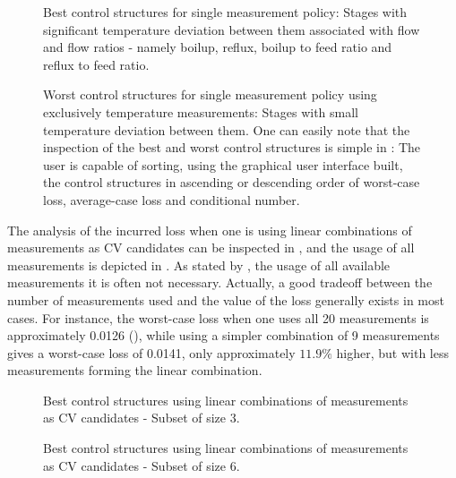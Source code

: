 \documentclass[../../msc-thesis.tex]{subfiles}
\begin{document}
\begin{figure}[htb]
    \centering
    \caption{Best control structures for single measurement policy: Stages 
    with significant temperature deviation between them associated with 
    flow and flow ratios - namely boilup, reflux, boilup to feed ratio and 
    reflux to feed ratio.}
    \label{fig:c3cvgood}
\end{figure}

\begin{figure}[htb]
    \centering
    \caption{Worst control structures for single measurement policy using 
    exclusively temperature measurements: Stages with small temperature 
    deviation between them. One can easily note that the inspection of the 
    best and worst control structures is simple in \mtc: The user is capable 
    of sorting, using the graphical user interface built, the control 
    structures in ascending or descending order of worst-case loss, 
    average-case loss and conditional number.}
    \label{fig:c3cvtempbad}
\end{figure}


The analysis of the incurred loss when one is using linear combinations of 
measurements as CV candidates can be inspected in 
, and the usage of all measurements is depicted in 
. As stated by \textcite{Kariwala2008}, the usage of all 
available measurements it is often not necessary. Actually, a good tradeoff 
between the number of measurements used and the value of the loss generally 
exists in most cases. For instance, the worst-case loss when one uses all 
20 measurements is  approximately 0.0126 (), while using a 
simpler combination of 9 measurements gives a worst-case loss of 0.0141, 
only  approximately $11.9 \%$ higher, but with less measurements forming the 
linear combination.

\begin{figure}[htb]
    \centering
    \caption{Best control structures using linear combinations of measurements 
    as CV candidates - Subset of size 3.}
    \label{fig:c3ss3}
\end{figure}

\begin{figure}[htb]
    \centering
    \caption{Best control structures using linear combinations of measurements 
    as CV candidates - Subset of size 6.}
    \label{fig:c3ss6}
\end{figure}
\end{document}
